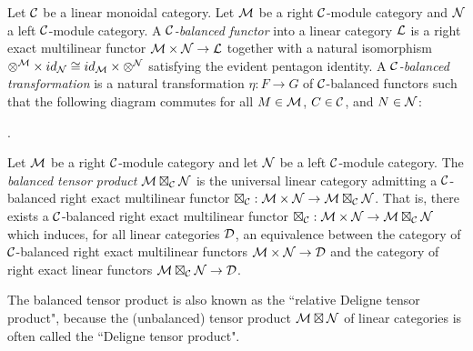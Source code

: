\documentclass{amsart}
\begin{document}
\begin{definition}
	Let $\mathcal C$ be a linear monoidal category. 
	Let $\mathcal M$ be a right $\mathcal C$-module category and $\mathcal N$ a left $\mathcal C$-module category. A {\em $\mathcal C$-balanced functor} into a linear category $\mathcal L$ is a right exact multilinear functor $\mathcal M \times \mathcal N \to \mathcal L$ together with a natural isomorphism $\otimes^{\mathcal M} \times id_{\mathcal N} \cong id_{\mathcal M} \times \otimes^{\mathcal N}$ satisfying the evident pentagon identity. A {\em $\mathcal C$-balanced transformation} is a natural transformation $\eta:F \to G$ of $\mathcal C$-balanced functors such that the following diagram commutes for all $M \in \mathcal M$, $C \in \mathcal C$, and $N \in \mathcal N$:
\begin{center}
.
\end{center}
\end{definition}


\begin{definition}
	Let $\mathcal M$ be a right $\mathcal C$-module category and let $\mathcal N$ be a left $\mathcal C$-module category. The {\em balanced tensor product} $\mathcal M \boxtimes_{\mathcal C} \mathcal N$
	is the universal linear category admitting a $\mathcal C$-balanced right exact multilinear functor $\boxtimes_{\mathcal C}: \mathcal M \times \mathcal N \to \mathcal M \boxtimes_{\mathcal C} \mathcal N$. That is, there exists a $\mathcal C$-balanced right exact multilinear functor $\boxtimes_{\mathcal C}: \mathcal M \times \mathcal N \to \mathcal M \boxtimes_{\mathcal C} \mathcal N$ which induces, for all linear categories $\mathcal D$, an equivalence between the category of $\mathcal C$-balanced right exact multilinear functors $\mathcal M \times \mathcal N \to \mathcal D$ and the category of right exact linear functors $\mathcal M \boxtimes_{\mathcal C} \mathcal N \to \mathcal D$. 
\end{definition}
\nid The balanced tensor product is also known as the ``relative Deligne tensor product", because the (unbalanced) tensor product $\mathcal M \boxtimes \mathcal N$ of linear categories is often called the ``Deligne tensor product".    
\end{document}
